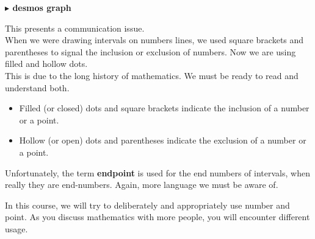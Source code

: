 \documentclass{ximera}
\begin{document}
\begin{example}
\begin{explanation}
\begin{image}
\end{image}

\end{explanation}
\end{example}






\textbf{\textcolor{blue!55!black}{$\blacktriangleright$ desmos graph}} 
\begin{center}
\end{center}





This presents a communication issue.  \\


When we were drawing intervals on numbers lines, we used square brackets and parentheses to signal the inclusion or exclusion of numbers.  Now we are using filled and hollow dots. \\

This is due to the long history of mathematics.  We must be ready to read and understand both.


\begin{itemize}
\item Filled (or closed) dots and square brackets indicate the inclusion of a number or a point.
\item Hollow (or open) dots and parentheses indicate the exclusion of a number or a point.
\end{itemize}

Unfortunately, the term \textbf{endpoint} is used for the end numbers of intervals, when really they are end-numbers. Again, more language we must be aware of.

In this course, we will try to deliberately and appropriately use number and point.  As you discuss mathematics with more people, you will encounter different usage.
\end{document}

